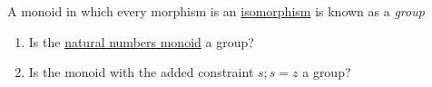 A monoid in which every morphism is an \href{doc/1 math/Seven Sketches in Compositionality/Chapter 3: Databases/2 Categories/5 Isomorphisms in a category/1 Isomorphism}{isomorphism} is known as a \emph{group}
    \begin{enumerate}
      \item Is the \href{doc/1 math/Seven Sketches in Compositionality/Chapter 3: Databases/2 Categories/1 Free Categories/3 Naturals as category}{natural numbers monoid} a group?
      \item  Is the monoid with the added constraint $s;s=z$  a group?
    \end{enumerate}